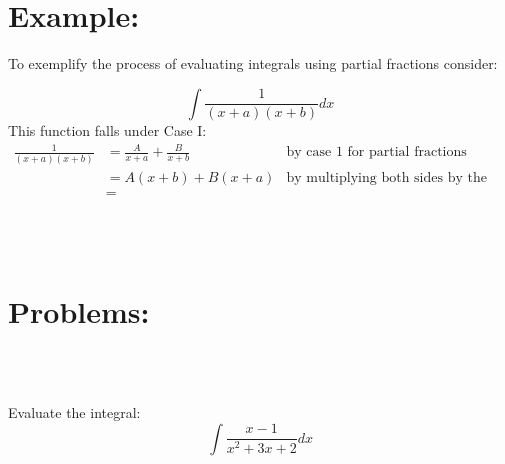 \documentclass[10pt,letterpaper, cm]{hmcpset}
\begin{document}
\section*{Example:}
To exemplify the process of evaluating integrals using partial fractions consider:


\begin{problem}

  \begin{equation*}
    \int\frac{1}{(x+a)(x+b)}dx 
  \end{equation*}
  This function falls under Case I:
  \begin{align*}
      \frac{1}{(x+a)(x+b)} &= \frac{A}{x+a} + \frac{B}{x+b} & \text{by case 1 for partial fractions}\\
     & =A(x+b) + B(x+a) &\text{by multiplying both sides by the denominator}\\
     & = 
  \end{align*}
\end{problem}\\
\\
\section*{Problems:}\\
\\
\begin{problem}[1]
  Evaluate the integral:
    \begin{equation*}
      \int\frac{x-1}{x^2 + 3x + 2}dx
    \end{equation*}
\end{problem}\\
\end{document}
